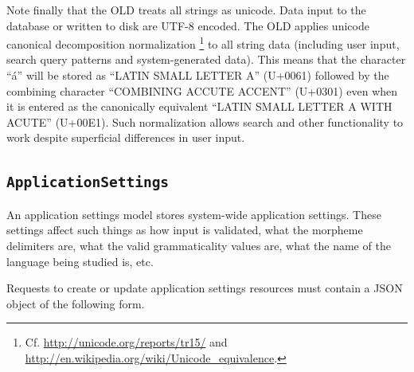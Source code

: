 \documentclass[letterpaper,10pt,english]{sphinxmanual}
\begin{document}
Note finally that the OLD treats all strings as unicode.  Data input to the
database or written to disk are UTF-8 encoded.  The OLD applies unicode
canonical decomposition normalization \footnote{
Cf. \href{http://unicode.org/reports/tr15/}{http://unicode.org/reports/tr15/} and
\href{http://en.wikipedia.org/wiki/Unicode\_equivalence}{http://en.wikipedia.org/wiki/Unicode\_equivalence}.
} to all string data (including user
input, search query patterns and system-generated data).  This means that the
character ``á'' will be stored as ``LATIN SMALL LETTER A'' (U+0061) followed by the
combining character ``COMBINING ACCUTE ACCENT'' (U+0301) even when it is entered
as the canonically equivalent ``LATIN SMALL LETTER A WITH ACUTE'' (U+00E1).  Such
normalization allows search and other functionality to work despite superficial
differences in user input.


\subsection{\texttt{ApplicationSettings}}
\label{datastructure:application-settings-data-structure}\label{datastructure:applicationsettings}
An application settings model stores system-wide application settings.  These
settings affect such things as how input is validated, what the morpheme
delimiters are, what the valid grammaticality values are, what the name of the
language being studied is, etc.

Requests to create or update application settings resources must contain a
JSON object of the following form.
\end{document}

